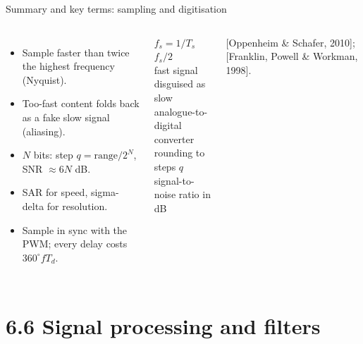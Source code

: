 \documentclass[aspectratio=169,10pt]{beamer}
\begin{document}
\begin{frame}{Summary and key terms: sampling and digitisation}
\begin{columns}[T]
\begin{itemize}\small
\item Sample faster than twice the highest frequency (Nyquist).
\item Too-fast content folds back as a fake slow signal (aliasing).
\item $N$ bits: step $q=\text{range}/2^N$, SNR $\approx 6N$ dB.
\item SAR for speed, sigma-delta for resolution.
\item Sample in sync with the PWM; every delay costs $360^\circ fT_d$.
\end{itemize}
\begin{defbox}
\small
{} $f_s=1/T_s$\\
 $f_s/2$\\
 fast signal disguised as slow\\
 analogue-to-digital converter\\
 rounding to steps $q$\\
 signal-to-noise ratio in dB
\end{defbox}
{\scriptsize\color{mkGray} [Oppenheim \& Schafer, 2010]; [Franklin, Powell \& Workman, 1998].}
\end{columns}
\end{frame}


\section{6.6 Signal processing and filters}
\end{document}
